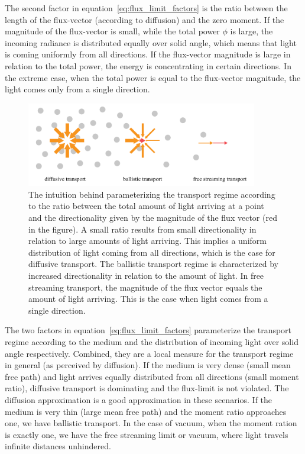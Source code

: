 The second factor in equation~\ref{eq:flux_limit_factors} is the ratio between the length of the flux-vector (according to diffusion) and the zero moment. If the magnitude of the flux-vector is small, while the total power $\phi$ is large, the incoming radiance is distributed equally over solid angle, which means that light is coming uniformly from all directions. If the flux-vector magnitude is large in relation to the total power, the energy is concentrating in certain directions. In the extreme case, when the total power is equal to the flux-vector magnitude, the light comes only from a single direction.
\begin{figure}[h]
\centering
\includegraphics[width=0.9\textwidth]{06_fld/figures/fig_transport_regimes_moment_ratio.pdf}
\caption{The intuition behind parameterizing the transport regime according to the ratio between the total amount of light arriving at a point and the directionality given by the magnitude of the flux vector (red in the figure). A small ratio results from small directionality in relation to large amounts of light arriving. This implies a uniform distribution of light coming from all directions, which is the case for diffusive transport. The ballistic transport regime is characterized by increased directionality in relation to the amount of light. In free streaming transport, the magnitude of the flux vector equals the amount of light arriving. This is the case when light comes from a single direction.}
\label{fig:fld_transport_regimes_mfp}
\end{figure}

The two factors in equation~\ref{eq:flux_limit_factors} parameterize the transport regime according to the medium and the distribution of incoming light over solid angle respectively. Combined, they are a local measure for the transport regime in general (as perceived by diffusion). If the medium is very dense (small mean free path) and light arrives equally distributed from all directions (small moment ratio), diffusive transport is dominating and the flux-limit is not violated. The diffusion approximation is a good approximation in these scenarios. If the medium is very thin (large mean free path) and the moment ratio approaches one, we have ballistic transport. In the case of vacuum, when the moment ration is exactly one, we have the free streaming limit or vacuum, where light travels infinite distances unhindered.

